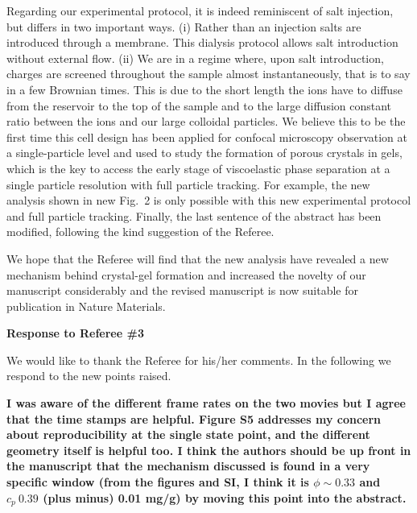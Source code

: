 \documentclass[11pt,a4paper]{article}
\newenvironment{referee}%
{\bigskip\singlespacing\bf}%
{\par\bigskip}
\begin{document}
Regarding our experimental protocol, it is indeed reminiscent of salt injection, but differs in two important ways. (i) Rather than an injection salts are introduced through a membrane. This dialysis protocol allows salt introduction without external flow. (ii) We are in a regime where, upon salt introduction, charges are screened throughout the sample almost instantaneously, that is to say in a few Brownian times. This is due to the short length the ions have to diffuse from the reservoir to the top of the sample and to the large diffusion constant ratio between the ions and our large colloidal particles.
We believe this to be the first time this cell design has been applied for confocal microscopy observation at a single-particle level and used to study the formation of porous crystals in gels, which is the key to access the early stage of viscoelastic phase separation at a single particle resolution with full particle tracking. 
For example, the new analysis shown in new Fig.~2 is only possible with this new experimental protocol and full particle tracking.  
Finally, the last sentence of the abstract has been modified, following the kind suggestion of the Referee. 

\vskip 0.5cm

We hope that the Referee will find that the new analysis have revealed a new mechanism behind 
crystal-gel formation and increased the novelty of our manuscript considerably and 
the revised manuscript is now suitable for publication in Nature Materials.  

\clearpage

\noindent
\begin{Large}
{\bf Response to Referee \#3}
\end{Large}


\vskip 0.5cm

We would like to thank the Referee for his/her comments. In the following we respond to the new points raised.

\begin{referee}
I was aware of the different frame rates on the two movies but I agree that the time stamps are helpful. Figure S5 addresses my concern about reproducibility at the single state point, and the different geometry itself is helpful too. I think the authors should be up front in the manuscript that the mechanism discussed is found in a very specific window (from the figures and SI, I think it is $\phi\sim 0.33$ and $c_p~0.39$ (plus minus) 0.01 mg/g) by moving this point into the abstract.
\end{referee}
\end{document}
